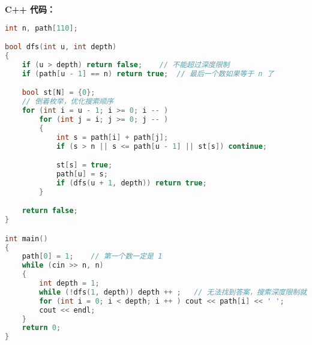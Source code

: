 \textbf{C++ 代码：}

\begin{lstlisting}[language=cpp]
int n, path[110];

bool dfs(int u, int depth)
{
    if (u > depth) return false;    // 不能超过深度限制
    if (path[u - 1] == n) return true;  // 最后一个数如果等于 n 了

    bool st[N] = {0};
    // 倒着枚举，优化搜索顺序
    for (int i = u - 1; i >= 0; i -- )
        for (int j = i; j >= 0; j -- )
        {
            int s = path[i] + path[j];
            if (s > n || s <= path[u - 1] || st[s]) continue;

            st[s] = true;
            path[u] = s;
            if (dfs(u + 1, depth)) return true;
        }

    return false;
}

int main()
{
    path[0] = 1;    // 第一个数一定是 1
    while (cin >> n, n)
    {
        int depth = 1;
        while (!dfs(1, depth)) depth ++ ;   // 无法找到答案，搜索深度限制就加一
        for (int i = 0; i < depth; i ++ ) cout << path[i] << ' ';
        cout << endl;
    }
    return 0;
}
\end{lstlisting}
